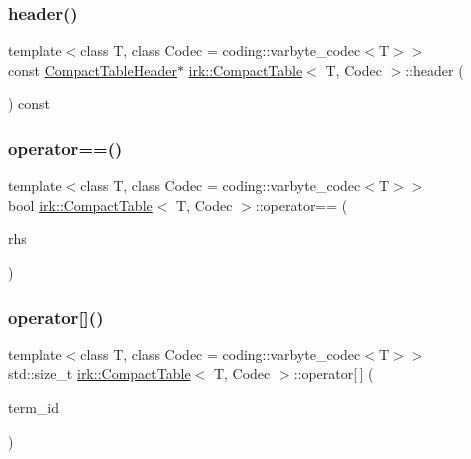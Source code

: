 \subsubsection{\texorpdfstring{header()}{header()}}
{\footnotesize\ttfamily template$<$class T, class Codec = coding\+::varbyte\+\_\+codec$<$\+T$>$$>$ \\
const \mbox{\hyperlink{structirk_1_1CompactTableHeader}{Compact\+Table\+Header}}$\ast$ \mbox{\hyperlink{classirk_1_1CompactTable}{irk\+::\+Compact\+Table}}$<$ T, Codec $>$\+::header (\begin{DoxyParamCaption}{ }\end{DoxyParamCaption}) const\hspace{0.3cm}{\ttfamily [inline]}}

\mbox{\label{classirk_1_1CompactTable_a9d24f06e148daecc62d8c28f99c83b17}} 
\subsubsection{\texorpdfstring{operator==()}{operator==()}}
{\footnotesize\ttfamily template$<$class T, class Codec = coding\+::varbyte\+\_\+codec$<$\+T$>$$>$ \\
bool \mbox{\hyperlink{classirk_1_1CompactTable}{irk\+::\+Compact\+Table}}$<$ T, Codec $>$\+::operator== (\begin{DoxyParamCaption}\item[{const \mbox{\hyperlink{classirk_1_1CompactTable}{Compact\+Table}}$<$ T, Codec $>$ \&}]{rhs }\end{DoxyParamCaption})\hspace{0.3cm}{\ttfamily [inline]}}

\mbox{\label{classirk_1_1CompactTable_ac38c5d57aa8e8f26f844952d0ac3b392}} 
\subsubsection{\texorpdfstring{operator[]()}{operator[]()}\hspace{0.1cm}{\footnotesize\ttfamily [1/2]}}
{\footnotesize\ttfamily template$<$class T, class Codec = coding\+::varbyte\+\_\+codec$<$\+T$>$$>$ \\
std\+::size\+\_\+t \mbox{\hyperlink{classirk_1_1CompactTable}{irk\+::\+Compact\+Table}}$<$ T, Codec $>$\+::operator\mbox{[}$\,$\mbox{]} (\begin{DoxyParamCaption}\item[{std\+::size\+\_\+t}]{term\+\_\+id }\end{DoxyParamCaption})\hspace{0.3cm}{\ttfamily [inline]}}

